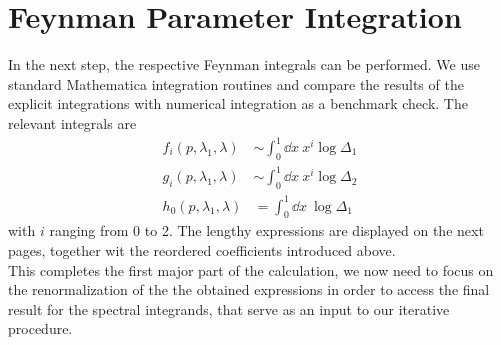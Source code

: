\section*{Feynman Parameter Integration}
In the next step, the respective Feynman integrals can be performed. We use standard Mathematica integration routines and compare the results of the explicit integrations with  numerical integration as a benchmark check. The relevant integrals are  
\begin{align}
	f_i(p,\lambda_1, \lambda) &\sim \int_0^1 \dd x\ x^{i} \operatorname{log}\Delta_1 \\
g_i(p,\lambda_1, \lambda) &\sim \int_0^1 \dd x\ x^{i} \operatorname{log}\Delta_2 \\
h_0(p,\lambda_1, \lambda) &= \int_0^1 \dd x\ \operatorname{log}\Delta_1
\end{align}
with $i$ ranging from 0 to 2. The lengthy expressions are displayed on the next pages, together wit the reordered coefficients introduced above.\\ This completes the first major part of the calculation, we now need to focus on the renormalization of the the obtained expressions in order to access the final result for the spectral integrands, that serve as an input to our iterative procedure. 

\newpage

